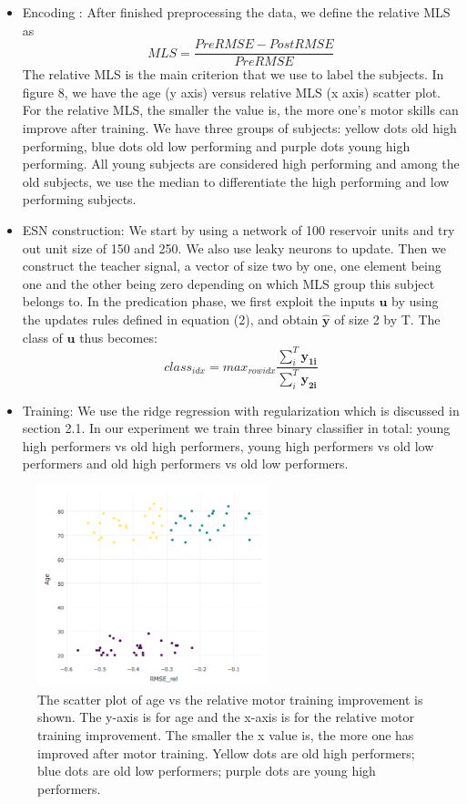 \documentclass[a4paper,11pt,oneside]{article}
\begin{document}
\begin{itemize}
	\item Encoding : After finished preprocessing the data, we define the relative MLS as $$ MLS = \frac{PreRMSE - PostRMSE}{PreRMSE}  $$
	The relative MLS is the main criterion that we use to label the subjects.   
	In figure 8, we have the age (y axis) versus relative MLS (x axis) scatter plot.  For the relative MLS, the smaller the value is, the more one's motor skills can improve after training. We have three groups of subjects: yellow dots old high performing, blue dots old low performing and purple dots young high performing. All young subjects are considered high performing and among the old subjects, we use the median to differentiate the high performing and low performing subjects.
	
	\item ESN construction:  We start by using a network of 100 reservoir units and try out unit size of 150 and 250. We also use leaky neurons to update. Then we construct the teacher signal, a vector of size two by one, one element being one and the other being zero depending on which MLS group this subject belongs to. In the predication phase, we first exploit the inputs $\mathbf{u}$ by using the updates rules defined in equation (2), and obtain $\hat{\mathbf{y}}$ of size 2 by T. The class of $\mathbf{u}$ thus becomes:
	$$ class_{idx} = max_{rowidx} \frac{\sum_i^T\mathbf{y_{1i}}}{\sum_i^T\mathbf{y_{2i}}} $$
	
	\item Training: We use the ridge regression with regularization which is discussed in section 2.1. In our experiment we train three binary classifier in total: young high performers vs old high performers, young high performers vs old low performers and old high performers vs old low performers.
	
\end{itemize}
\begin{figure}[h]
	\centering
	\includegraphics[width=0.6\textwidth]{img/scatter}
	\caption{The scatter plot of age vs the relative motor training improvement is shown. The y-axis is for age and the x-axis is for the relative motor training improvement. The smaller the x value is, the more one has improved after motor training. Yellow dots are old high performers; blue dots are old low performers; purple dots are young high performers.}
\end{figure}
\end{document}
